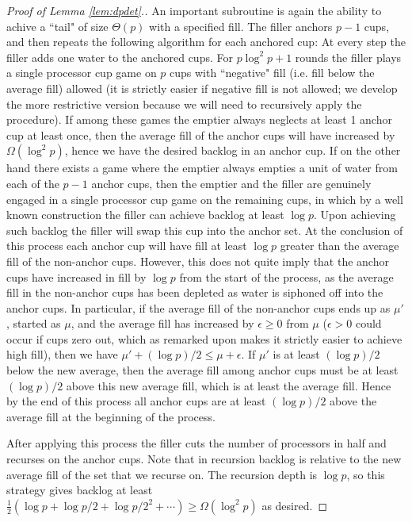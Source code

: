 \documentclass{article}[11pt]
\begin{document}
\begin{proof}[Proof of Lemma \ref{lem:dpdet}.]
  An important subroutine is again the ability to achive a ``tail" of size
  $\Theta(p)$ with a specified fill. The filler anchors $p-1$ cups, and then
  repeats the following algorithm for each anchored cup: At every step the
  filler adds one water to the anchored cups. For $p\log^2 p + 1$ rounds the
  filler plays a single processor cup game on $p$ cups with ``negative"
  fill (i.e. fill below the average fill) allowed (it is strictly easier if
  negative fill is not allowed; we develop the more restrictive version because
  we will need to recursively apply the procedure). If among these games
  the emptier always neglects at least 1 anchor cup at least once, then the average 
  fill of the anchor cups will have increased by $\Omega(\log^2 p)$, hence
  we have the desired backlog in an anchor cup. If on the other hand there exists a game
  where the emptier always empties a unit of water from each of the $p-1$ anchor cups, 
  then the emptier and the filler are genuinely engaged in a single processor cup game on the remaining cups,
  in which by a well known construction the filler can achieve backlog at least $\log p$.
  Upon achieving such backlog the filler will swap this cup into the anchor set.
  At the conclusion of this process each anchor cup will have fill at least
  $\log p$ greater than the average fill of the non-anchor cups. However, this
  does not quite imply that the anchor cups have increased in fill by $\log p$
  from the start of the process, as the average fill in the non-anchor cups has
  been depleted as water is siphoned off into the anchor cups. In particular,
  if the average fill of the non-anchor cups ends up as $\mu'$, started as
  $\mu$, and the average fill has increased by $\epsilon \ge 0$ from $\mu$
  ($\epsilon >0$ could occur if cups zero out, which as remarked upon makes it
  strictly easier to achieve high fill), then we have $\mu' + (\log p)/ 2 \le
  \mu +\epsilon$. If $\mu'$ is at least $(\log p )/2$ below the new average,
  then the average fill among anchor cups must be at least $(\log p)/2$ above
  this new average fill, which is at least the average fill. Hence by the end
  of this process all anchor cups are at least $(\log p)/2$ above the average
  fill at the beginning of the process.

  After applying this process the filler cuts the number of processors in half and
  recurses on the anchor cups. Note that in recursion backlog is relative to
  the new average fill of the set that we recurse on. The recursion depth is
  $\log p$, so this strategy gives backlog at least $\frac{1}{2}(\log p + \log p/2 + \log
  p/2^2 + \cdots) \ge \Omega(\log^2 p)$ as desired.

\end{proof}
\end{document}
